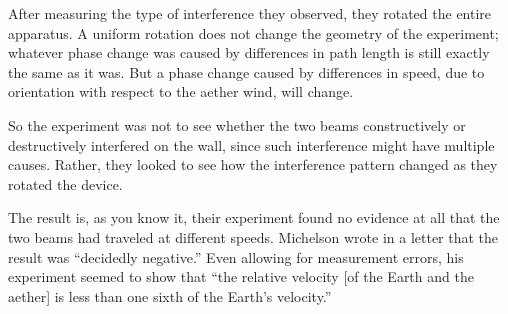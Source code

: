 \documentclass[../main.tex]{subfiles}
\begin{document}
After measuring the type of interference they observed, they rotated the entire apparatus. A uniform rotation does not change the geometry of the experiment; whatever phase change was caused by differences in path length is still exactly the same as it was. But a phase change caused by differences in speed, due to orientation with respect to the aether wind, will change. 

So the experiment was not to see whether the two beams constructively or destructively interfered on the wall, since such interference might have multiple causes. Rather, they looked to see how the interference pattern changed as they rotated the device. 

The result is, as you know it, their experiment found no evidence at all that the two beams had traveled at different speeds.  Michelson wrote in a letter that the result was “decidedly negative.” Even allowing for measurement errors, his experiment seemed to show that “the relative velocity [of the Earth and the aether] is less than one sixth of the Earth's velocity.”
\end{document}
